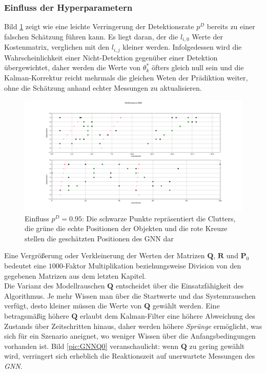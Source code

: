 \documentclass[10pt,a4paper]{article}
\begin{document}
\subsubsection{Einfluss der Hyperparametern}\label{subsub: GNNParameter}
Bild \ref{pic:GNNPD} zeigt wie eine leichte Verringerung der Detektionsrate $p^D$ bereits zu einer falschen Schätzung führen kann. Es liegt daran, der  die $l_{i,0}$ Werte der Kostenmatrix, verglichen mit den $l_{i,j}$ kleiner werden. Infolgedessen wird die Wahrscheinlichkeit einer Nicht-Detektion gegenüber einer Detektion übergewichtet, daher werden die Werte von $\theta^*_k$ öfters gleich null sein und die Kalman-Korrektur reicht mehrmals die gleichen Weten der Prädiktion weiter, ohne die Schätzung anhand echter Messungen zu aktualisieren. \\
\begin{figure}[h!]
\includegraphics[width=12 cm]{./Pictures_report/GNNPD}
\caption{Einfluss $p^D = 0.95$: Die schwarze Punkte repräsentiert die Clutters, die grüne die echte Positionen der Objekten und die rote Kreuze stellen die geschätzten Positionen des GNN dar}
\label{pic:GNNPD}
\end{figure}
Eine Vergrößerung oder Verkleinerung der Werten der Matrizen $\textbf{Q}$, $\textbf{R}$ und $\textbf{P}_0$ bedeutet eine $1000$-Faktor Multiplikation beziehungsweise Division von den gegebenen Matrizen aus dem letzten Kapitel.\\
Die Varianz des Modellrauschen $\textbf{Q}$ entscheidet über die Einsatzfähigkeit des Algorithmus. Je mehr Wissen man über die Startwerte und das Systemrauschen verfügt, desto kleiner müssen die Werte von $\textbf{Q}$ gewählt werden. Eine betragsmäßig höhere $\textbf{Q}$ erlaubt dem Kalman-Filter eine höhere Abweichung des Zustands über Zeitschritten hinaus, daher werden höhere \textit{Sprünge} ermöglicht, was sich für ein Szenario aneignet, wo weniger Wissen über die Anfangsbedingungen vorhanden ist. Bild \ref{pic:GNNQ0} veranschaulicht: wenn $\textbf{Q}$ zu gering gewählt wird, verringert sich erheblich die Reaktionszeit auf unerwartete Messungen des \textit{GNN}.\\
\end{document}
